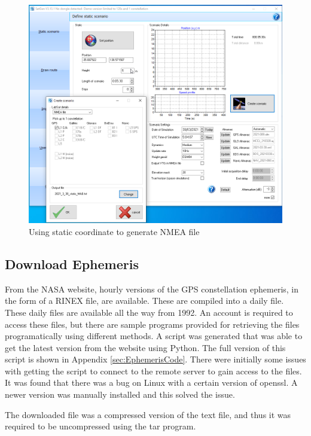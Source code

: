 \begin{figure}[!ht]
    \begin{centering}
        \includegraphics[width=12cm,keepaspectratio]{Figures/2021_03_30_static_MAB_setup.png}
        \caption{Using static coordinate to generate NMEA file}
    \label{fig:StaticCoordinateNMEA}
    \end{centering}
\end{figure}

\subsection{Download Ephemeris}
From the NASA website, hourly versions of the GPS constellation ephemeris, in the form of a RINEX file, are available. These are compiled into a daily file. These daily
files are available all the way from 1992. An account is required to access these files, but there are sample programs provided for retrieving
the files programatically using different methods. A script was generated that was able to get the latest version from the website using Python. The full version of this
script is shown in Appendix \ref{sec:EphemerisCode}. There were initially some
issues with getting the script to connect to the remote server to gain access to the files. It was found that there was a bug on Linux with a certain version of openssl.
A newer version was manually installed and this solved the issue.

The downloaded file was a compressed version of the text file, and thus it was required to be uncompressed using the tar program.

